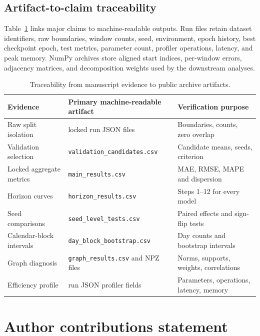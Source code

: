 \documentclass[fleqn,10pt]{wlscirep}
\newenvironment{changedcontent}{\color{changeblue}}{}
\begin{document}
\begin{changedcontent}
\subsection{Artifact-to-claim traceability}
Table~\ref{tab:artifact_traceability} links major claims to machine-readable
outputs. Run files retain dataset identifiers, raw boundaries, window counts,
seed, environment, epoch history, best checkpoint epoch, test metrics,
parameter count, profiler operations, latency, and peak memory. NumPy archives
store aligned start indices, per-window errors, adjacency matrices, and
decomposition weights used by the downstream analyses.
\begin{table}[t]
\centering
\caption{Traceability from manuscript evidence to public archive artifacts.}
\label{tab:artifact_traceability}
\small
\begin{tabular}{lll}
\toprule
Evidence & Primary machine-readable artifact & Verification purpose\\
\midrule
Raw split isolation & locked run JSON files & Boundaries, counts, zero overlap\\
Validation selection & \texttt{validation\_candidates.csv} & Candidate means, seeds, criterion\\
Locked aggregate metrics & \texttt{main\_results.csv} & MAE, RMSE, MAPE and dispersion\\
Horizon curves & \texttt{horizon\_results.csv} & Steps 1--12 for every model\\
Seed comparisons & \texttt{seed\_level\_tests.csv} & Paired effects and sign-flip tests\\
Calendar-block intervals & \texttt{day\_block\_bootstrap.csv} & Day counts and bootstrap intervals\\
Graph diagnosis & \texttt{graph\_results.csv} and NPZ files & Norms, supports, weights, correlations\\
Efficiency profile & run JSON profiler fields & Parameters, operations, latency, memory\\
\bottomrule
\end{tabular}
\end{table}
\end{changedcontent}

\FloatBarrier

\section*{Author contributions statement}
\end{document}
